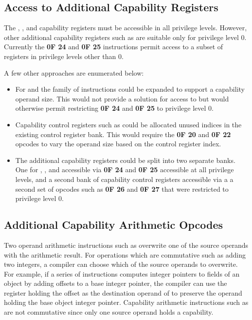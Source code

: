 \subsection{Access to Additional Capability Registers}

The \CFS{}, \CGS{}, and \DDC{} capability registers must be accessible
in all privilege levels.  However, other additional capability
registers such as \KGS{} are suitable only for privilege level 0.
Currently the \textbf{0F 24} and \textbf{0F 25} instructions permit
access to a subset of registers in privilege levels other than 0.

A few other approaches are enumerated below:

\begin{itemize}
  \item For \CFS{} and \CGS{} the  family of
    instructions could be expanded to support a capability operand
    size.  This would not provide a solution for access to \DDC{} but
    would otherwise permit restricting \textbf{0F 24} and \textbf{0F
      25} to privilege level 0.

  \item Capability control registers such as \KGS{} could be allocated
    unused indices in the existing control register bank.  This would
    require the \textbf{0F 20} and \textbf{0F 22} opcodes to vary the
    operand size based on the control register index.

  \item The additional capability registers could be split into two
    separate banks.  One for \CFS{}, \CGS{}, and \DDC{} accessible via
    \textbf{0F 24} and \textbf{0F 25} accessible at all privilege
    levels, and a second bank of capability control registers
    accessible via a a second set of opcodes such as \textbf{0F 26}
    and \textbf{0F 27} that were restricted to privilege level 0.
\end{itemize}

\subsection{Additional Capability Arithmetic Opcodes}

Two operand arithmetic instructions such as  overwrite
one of the source operands with the arithmetic result.  For operations
which are commutative such as adding two integers, a compiler can
choose which of the source operands to overwrite.  For example, if a
series of instructions computes integer pointers to fields of an
object by adding offsets to a base integer pointer, the compiler can
use the register holding the offset as the destination operand of
 to preserve the operand holding the base object
integer pointer.  Capability arithmetic instructions such as
 are not commutative since only one source
operand holds a capability.

